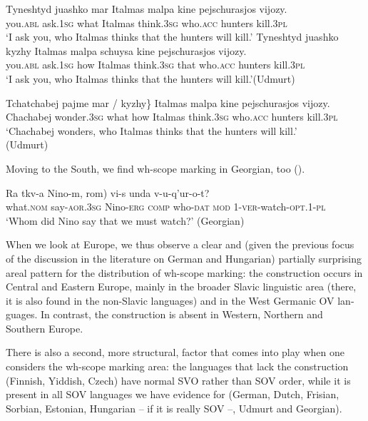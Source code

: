 \documentclass[output=paper,colorlinks,citecolor=brown]{langscibook}
\begin{document}
\begin{otherlanguage}{english}
\ea\label{ex:fanselow:34}
\ea     
\gll  Tyneshtyd 	juashko 	mar  	Italmas 	malpa  	kine 	pejschurasjos 	vijozy. \\
      you.\textsc{abl} ask.1\textsc{sg} what Italmas think.3\textsc{sg} who.\textsc{acc} hunters kill.3\textsc{pl}   \\
\glt ‘I ask you, who Italmas thinks that the hunters will kill.'
\label{ex:fanselow:34a}
\ex     
\gll    Tyneshtyd 	juashko 	kyzhy  	Italmas 	malpa  	schuysa   	kine 	pejschurasjos 	vijozy. \\
         you.\textsc{abl} ask.1\textsc{sg} how Italmas think.3\textsc{sg} that who.\textsc{acc} hunters kill.3\textsc{pl}  \\
\glt ‘I ask you, who Italmas thinks that the hunters will kill.'\hfill (Udmurt)
\label{ex:fanselow:34b}
\z\z

\ea \label{ex:fanselow:35}
\gll  Tchatchabej 	pajme 	\minsp{\{} mar / kyzhy\}  	Italmas 	malpa	kine 		pejschurasjos   vijozy. \\
    Chachabej wonder.3\textsc{sg} {} what {} how Italmas think.3\textsc{sg} who.\textsc{acc} hunters kill.3\textsc{pl}   \\
    \glt    ‘Chachabej wonders, who Italmas thinks that the hunters will kill.' \\\hfill (Udmurt)
    \z

\noindent Moving to the South, we find wh-scope marking in Georgian, too (\citealt[150ff.]{Borise2019}).

\ea \label{ex:fanselow:36}
\gll  Ra 	tkv-a 	Nino-m, 	 \minsp{(} rom) 	vi-s 	unda 	v-u-q’ur-o-t? \\
    what.\textsc{nom} say-\textsc{aor}.3\textsc{sg} Nino-\textsc{erg} {} \textsc{comp} who-\textsc{dat} \textsc{mod} 1-\textsc{ver}-watch-\textsc{opt}.1-\textsc{pl}   \\
    \glt    ‘Whom did Nino say that we must watch?' \hfill (Georgian)
    \z

\noindent When we look at Europe, we thus observe a clear and (given the previous focus of the discussion in the literature on German and Hungarian) partially surprising areal pattern for the distribution of wh-scope marking: the construction occurs in Central and Eastern Europe, mainly in the broader Slavic linguistic area (there, it is also found in the non-Slavic languages) and in the West Germanic OV languages. In contrast, the construction is absent in Western, Northern and Southern Europe.

There is also a second, more structural, factor that comes into play when one considers the wh-scope marking area: the languages that lack the construction (Finnish, Yiddish, Czech) have normal SVO  rather than SOV order, while it is present in all SOV languages we have evidence for (German, Dutch, Frisian, Sorbian, Estonian, Hungarian -- if it is really SOV --, Udmurt and Georgian). 


\end{otherlanguage}
\end{document}
